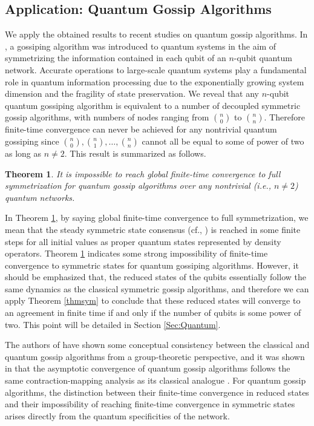 \documentclass[a4paper, 11pt]{article}
\newtheorem{theorem}{Theorem}
\begin{document}
\subsection{Application: Quantum Gossip Algorithms}
We apply the obtained results to recent studies on quantum gossip algorithms. In \cite{Mazzarella2013a,Mazzarella2013b}, a gossiping algorithm was introduced to quantum systems in the aim of symmetrizing  the information contained in each qubit of an $n$-qubit quantum network. Accurate operations to large-scale quantum systems play a fundamental role in quantum information processing due to the exponentially growing system dimension and the fragility of state preservation.  We reveal that any $n$-qubit quantum gossiping algorithm is equivalent to a number of decoupled  symmetric gossip algorithms, with numbers of nodes ranging from $\binom{n}{0}$ to $\binom{n}{n}$. Therefore finite-time convergence can never be achieved for any nontrivial quantum gossiping  since  $\binom{n}{0},\binom{n}{1},\dots,\binom{n}{n}$ cannot all be equal to some of power of two as long as $n\neq 2$. This result is summarized as follows.

\medskip

{

\begin{theorem}\label{propquantum}
It is impossible to reach global finite-time convergence to full symmetrization for quantum gossip algorithms over any nontrivial  (i.e., $n \neq 2$) quantum networks.
\end{theorem}
}


\medskip

 {
In Theorem \ref{propquantum}, by saying global {finite-time} convergence  to full symmetrization,  we mean that the steady symmetric  state consensus (cf., \cite{Mazzarella2013a}) is reached in some finite steps for all initial values as  proper quantum states represented by density operators. Theorem \ref{propquantum} indicates some strong impossibility of finite-time convergence to symmetric states for quantum gossiping algorithms. However,  it should be emphasized that,  the reduced states of the qubits  essentially follow the same dynamics as the classical symmetric  gossip algorithms, and therefore we can   apply Theorem \ref{thmsym} to conclude that these reduced states will converge to an agreement in finite time if and only if the number of qubits is some power of two. This point will be detailed in Section \ref{Sec:Quantum}.

  The authors of \cite{Mazzarella2013a,Mazzarella2013b} have shown some  conceptual consistency between the classical and quantum gossip algorithms from a group-theoretic perspective, and it was shown in \cite{Mazzarella2013a} that  the asymptotic convergence of quantum gossip algorithms   follows the same contraction-mapping analysis  as its classical analogue \cite{Boyd2006}. For quantum gossip algorithms, the distinction between their  finite-time convergence in reduced states and their  impossibility of reaching finite-time convergence in symmetric states  arises directly from the quantum specificities of the network.  }
\end{document}
